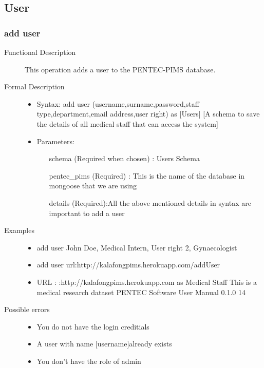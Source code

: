 \documentclass[14pt, a4paper]{article}
\begin{document}
\subsection{User}
	  
\subsubsection{add user}
\begin{description}
\item [Functional Description] This operation adds a user to the PENTEC-PIMS database.
\item [Formal Description] \hfill
\begin{itemize}
	\item Syntax: add user (username,surname,password,staff type,department,email address,user right) as [Users] [A schema to save the details of all medical staff that can access the system]\\
	\item Parameters:
		\begin{itemize}
			\item [schema] (Required when chosen) : Users Schema\\
			\item [pentec\_pims] (Required) : This is the name of the database in mongoose that we are using\\
			\item [details](Required):All the above mentioned details in syntax are important to add a user\\
		 \end{itemize}
\end{itemize}
\item[Examples]\hfill
\begin{itemize}
	\item add user John Doe, Medical Intern, User right 2, Gynaecologist
	\item add user url:http://kalafongpims.herokuapp.com/addUser
	\item URL : :http://kalafongpims.herokuapp.com as Medical Staff This is a medical research dataset PENTEC Software User Manual 0.1.0 14
\end{itemize}
\item[Possible errors]\hfill
	\begin{itemize}
	\item You do not have the login creditials
	\item A user with name [username]already exists
	\item You don't have the role of admin

\end{itemize}
\end{description}
\end{document}
